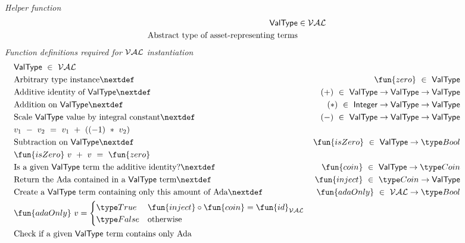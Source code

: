 \begin{figure}[htb]
  \emph{Helper function}
  \begin{align*}
    \mathsf{ValType} &\in \mathcal{VAL}  \\
    \text{Abstract type of asset-representing terms}
  \end{align*}
  \emph{Function definitions required for $\mathcal{VAL}$ instantiation}
  \begin{align*}
      & \mathsf{ValType} ~\in~ \ValClass  \\
      & \text{Arbitrary type instance}
      \nextdef
      & \fun{zero} ~\in~ \mathsf{ValType} \\
      & \text{Additive identity of $\mathsf{ValType}$}
      \nextdef
      & (+) ~\in~ \mathsf{ValType} \to \mathsf{ValType} \to \mathsf{ValType}\\
      & \text{Addition on $\mathsf{ValType}$}
      \nextdef
      & (*) ~\in~ \mathsf{Integer} \to \mathsf{ValType} \to \mathsf{ValType}\\
      & \text{Scale $\mathsf{ValType}$ value by integral constant}
      \nextdef
      & (-) ~\in~ \mathsf{ValType} \to \mathsf{ValType} \to \mathsf{ValType}\\
      & v_1~-~v_2 ~=~ v_1~+~((-1)~*~v_2)\\
      & \text{Subtraction on $\mathsf{ValType}$}
      \nextdef
      & \fun{isZero} ~\in~ \mathsf{ValType} \to \Bool\\
      & \fun{isZero}~v ~+~ v~=~\fun{zero} \\
      & \text{Is a given $\mathsf{ValType}$ term the additive identity?}
      \nextdef
      & \fun{coin} ~\in~ \mathsf{ValType} \to \Coin\\
      & \text{Return the Ada contained in a $\mathsf{ValType}$ term}
      \nextdef
      & \fun{inject} ~\in~ \Coin \to \mathsf{ValType}\\
      & \text{Create a $\mathsf{ValType}$ term containing only this amount of Ada}
      \nextdef
      & \fun{adaOnly} ~\in~ \ValClass \to \Bool \\
      & \fun{adaOnly}~v =
        \begin{cases}
          \True & \fun{inject} \circ \fun{coin} = \fun{id}_{\ValClass} \\
          \False & \text{otherwise}
        \end{cases} \\
      & \text{Check if a given $\mathsf{ValType}$ term contains only Ada}

\end{align*}
\end{figure}
